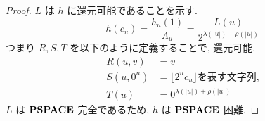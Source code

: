 \begin{proof}
 $L$ は $h$ に還元可能であることを示す.
 \begin{equation}
  h(c_u) = \frac{h_u(1)}{\Lambda_u}
   = \frac{L(u)}{2^{\lambda(|u|)+\rho(|u|)}}
 \end{equation}
 つまり $R,S,T$ を以下のように定義することで, 還元可能.
 \begin{align}
  R(u,v) &= v \\
  S(u, 0^n) &= \lfloor 2^nc_u \rfloor \text{を表す文字列,} \\
  T(u) &= 0^{\lambda(|u|)+\rho(|u|)}
 \end{align}
 $L$ は $\mathbf{PSPACE}$ 完全であるため, $h$ は $\mathbf{PSPACE}$ 困難.
\end{proof}



